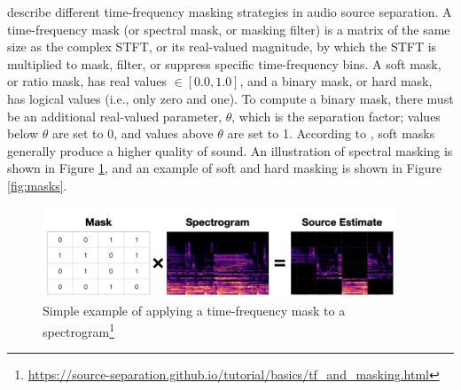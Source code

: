\documentclass[report.tex]{subfiles}
\begin{document}
\textcite{masking} describe different time-frequency masking strategies in audio source separation. A time-frequency mask (or spectral mask, or masking filter) is a matrix of the same size as the complex STFT, or its real-valued magnitude, by which the STFT is multiplied to mask, filter, or suppress specific time-frequency bins. A soft mask, or ratio mask, has real values $\in [0.0, 1.0]$, and a binary mask, or hard mask, has logical values (i.e., only zero and one). To compute a binary mask, there must be an additional real-valued parameter, $\theta$, which is the separation factor; values below $\theta$ are set to 0, and values above $\theta$ are set to 1. According to \textcite{masking}, soft masks generally produce a higher quality of sound. An illustration of spectral masking is shown in Figure \ref{fig:simplemasks}, and an example of soft and hard masking is shown in Figure \ref{fig:masks}.

\begin{figure}[ht]
       \centering
        \begin{minipage}{1.\textwidth}
               \renewcommand\footnoterule{} %
               \renewcommand{\thempfootnote}{\fnsymbol{mpfootnote}}
               \includegraphics[width=0.9375\textwidth]{./images-mss/mask_simple.png}
		\caption[Simple example of applying a time-frequency mask to a spectrogram]{Simple example of applying a time-frequency mask to a spectrogram\footnote[1]{\url{https://source-separation.github.io/tutorial/basics/tf_and_masking.html}}}
               \label{fig:simplemasks}
       \end{minipage}
\end{figure}
\end{document}
